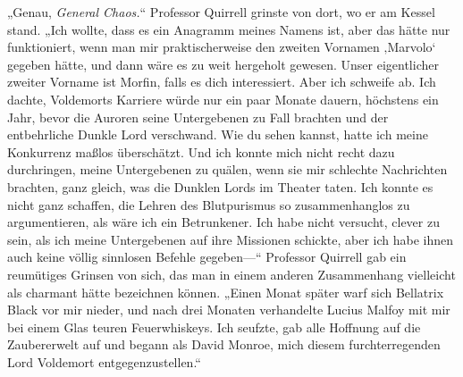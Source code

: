 „Genau, \emph{General Chaos.}“
Professor Quirrell grinste von dort, wo er am Kessel stand.
„Ich wollte, dass es ein Anagramm meines Namens ist, aber das hätte nur funktioniert, wenn man mir praktischerweise den zweiten Vornamen ‚Marvolo‘ gegeben hätte, und dann wäre es zu weit hergeholt gewesen. Unser eigentlicher zweiter Vorname ist Morfin, falls es dich interessiert. Aber ich schweife ab. Ich dachte, Voldemorts Karriere würde nur ein paar Monate dauern, höchstens ein Jahr, bevor die Auroren seine Untergebenen zu Fall brachten und der entbehrliche Dunkle Lord verschwand. Wie du sehen kannst, hatte ich meine Konkurrenz maßlos überschätzt. Und ich konnte mich nicht recht dazu durchringen, meine Untergebenen zu quälen, wenn sie mir schlechte Nachrichten brachten, ganz gleich, was die Dunklen Lords im Theater taten. Ich konnte es nicht ganz schaffen, die Lehren des Blutpurismus so zusammenhanglos zu argumentieren, als wäre ich ein Betrunkener.
Ich habe nicht versucht, clever zu sein, als ich meine Untergebenen auf ihre Missionen schickte, aber ich habe ihnen auch keine völlig sinnlosen Befehle gegeben—“
Professor Quirrell gab ein reumütiges Grinsen von sich, das man in einem anderen Zusammenhang vielleicht als charmant hätte bezeichnen können.
„Einen Monat später warf sich Bellatrix Black vor mir nieder, und nach drei Monaten verhandelte Lucius Malfoy mit mir bei einem Glas teuren Feuerwhiskeys. Ich seufzte, gab alle Hoffnung auf die Zaubererwelt auf und begann als David Monroe, mich diesem furchterregenden Lord Voldemort entgegenzustellen.“

